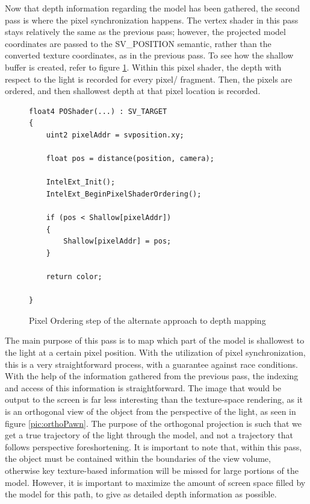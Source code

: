 \documentclass[a4paper, 12pt]{article}
\begin{document}
Now that depth information regarding the model has been gathered, the second
pass is where the pixel synchronization happens. The vertex shader in this
pass stays relatively the same as the previous pass; however, the projected
model coordinates are passed to the SV\_POSITION semantic, rather than the
converted texture coordinates, as in the previous pass. To see how the shallow
buffer is created, refer to figure \ref{code:POShader}. Within this pixel
shader, the depth with respect to the light is recorded for every pixel/
fragment. Then, the pixels are ordered, and then shallowest depth at that
pixel location is recorded.

\begin{figure}[h]
\begin{lstlisting}[breaklines=true, language=HLSL]
float4 POShader(...) : SV_TARGET
{
	uint2 pixelAddr = svposition.xy;

	float pos = distance(position, camera);

	IntelExt_Init();
	IntelExt_BeginPixelShaderOrdering();

	if (pos < Shallow[pixelAddr])
	{
		Shallow[pixelAddr] = pos;
	}

	return color;
	
}

\end{lstlisting}
\caption{Pixel Ordering step of the alternate approach to depth mapping}
\label{code:POShader}
\end{figure}

\noindent The main purpose of this pass is to map which part of the model is
shallowest to the light at a certain pixel position. With the utilization of
pixel synchronization, this is a very straightforward process, with a
guarantee against race conditions. With the help of the information gathered
from the previous pass, the indexing and access of this information is
straightforward. The image that would be output to the screen is far less
interesting than the texture-space rendering, as it is an orthogonal view of
the object from the perspective of the light, as seen in figure
\ref{pic:orthoPawn}. The purpose of the orthogonal projection is such that we
get a true trajectory of the light through the model, and not a trajectory
that follows perspective foreshortening. It is important to note that, within
this pass, the object must be contained within the boundaries of the view
volume, otherwise key texture-based information will be missed for large
portions of the model. However, it is important to maximize the amount of
screen space filled by the model for this path, to give as detailed depth
information as possible.
\end{document}

